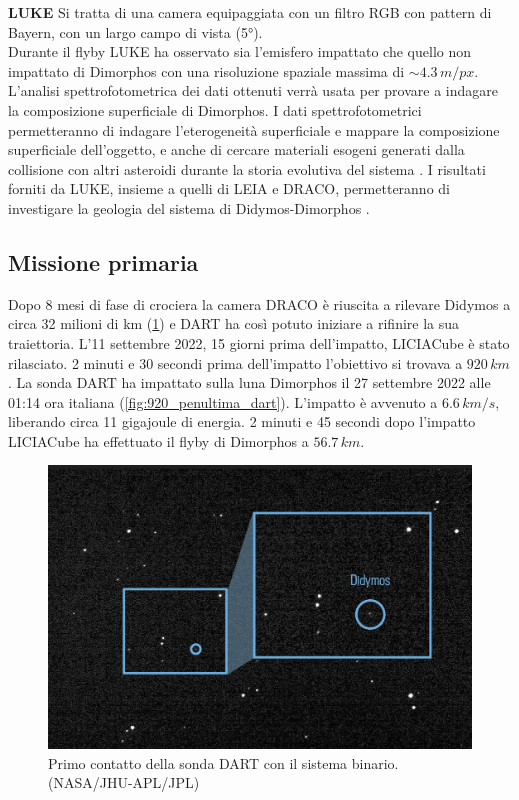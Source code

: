 \documentclass[a4paper,11pt,openright]{book}
\begin{document}
\qquad \small{\textbf{LUKE}} Si tratta di una camera equipaggiata con un filtro RGB con pattern di Bayern, con un largo campo di vista (5°).\\
Durante il flyby LUKE ha osservato sia l'emisfero impattato che quello non impattato di Dimorphos con una risoluzione spaziale massima di $\sim 4.3\,m/px$. L'analisi spettrofotometrica dei dati ottenuti verrà usata per provare a indagare la composizione superficiale di Dimorphos. I dati spettrofotometrici permetteranno di indagare l'eterogeneità superficiale e mappare la composizione superficiale dell'oggetto, e anche di cercare materiali esogeni generati dalla collisione con altri asteroidi durante la storia evolutiva del sistema \citep{poggiali_expected_2022}. I risultati forniti da LUKE, insieme a quelli di LEIA e DRACO, permetteranno di investigare la geologia del sistema di Didymos-Dimorphos \citep{pajola_anticipated_2022}.

\subsection{Missione primaria}
Dopo 8 mesi di fase di crociera la camera DRACO è riuscita a rilevare Didymos a circa 32 milioni di km (\cref{fig:primo_contatto}) e DART ha così potuto iniziare a rifinire la sua traiettoria. 
L'11 settembre 2022, 15 giorni prima dell'impatto, LICIACube è stato rilasciato. 2 minuti e 30 secondi prima dell'impatto l'obiettivo si trovava a $920\,km$. La sonda DART ha impattato sulla luna Dimorphos il 27 settembre 2022 alle 01:14 ora italiana (\cref{fig:920_penultima_dart}).
L'impatto è avvenuto a $6.6\,km/s$, liberando circa 11 gigajoule di energia.
2 minuti e 45 secondi dopo l'impatto LICIACube ha effettuato il flyby di Dimorphos a $56.7\,km$.

\begin{figure}[!h]
\centering
	\includegraphics[width=.8\textwidth]{figure/primo_contatto.jpg}
\caption[Primo contatto della sonda DART con il sistema binario.]{Primo contatto della sonda DART con il sistema binario. (NASA/JHU-APL/JPL)}
\label{fig:primo_contatto}
\end{figure}
\end{document}
